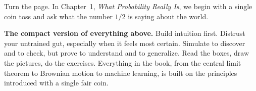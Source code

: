 Turn the page. In Chapter~1, \emph{What Probability Really Is}, we begin with a
single coin toss and ask what the number $1/2$ is
saying about the world.

\begin{focusbox}
\textbf{The compact version of everything above.} Build intuition first.
Distrust your untrained gut, especially when it feels most certain. Simulate to
discover and to check, but prove to understand and to generalize. Read the
boxes, draw the pictures, do the exercises. Everything in the book, from
the central limit theorem to Brownian motion to machine learning, is built on
the principles introduced with a single fair coin.
\end{focusbox}
